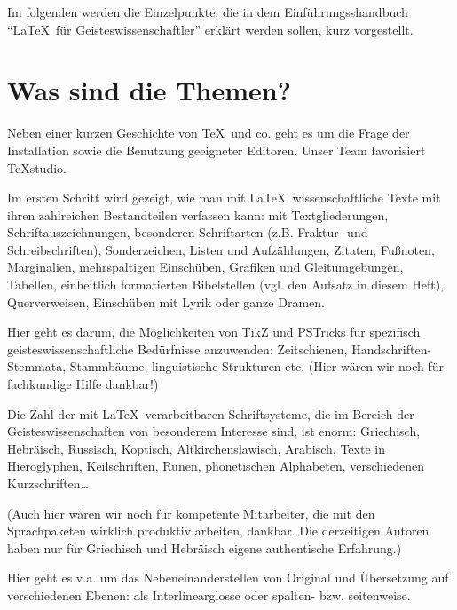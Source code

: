 \documentclass[ngerman]{dtk}
\begin{document}
Im folgenden werden die Einzelpunkte, die in dem Einführungsshandbuch \enquote{\LaTeX\ für Geisteswissenschaftler}
erklärt werden sollen, kurz vorgestellt.


\section{Was sind die Themen?}



Neben einer kurzen Geschichte von \TeX\ und co. geht es um die Frage der Installation sowie die Benutzung 
geeigneter Editoren.
Unser Team favorisiert TeXstudio.


Im ersten Schritt wird gezeigt, wie man mit \LaTeX\ wissenschaftliche Texte mit ihren zahlreichen Bestandteilen
verfassen kann: mit Textgliederungen, Schriftauszeichnungen, besonderen Schriftarten (z.B. Fraktur- und
Schreibschriften), Sonderzeichen, Listen und Aufzählungen, Zitaten, Fußnoten, Marginalien, mehrspaltigen
Einschüben, Grafiken und Gleitumgebungen, Tabellen, einheitlich formatierten Bibelstellen (vgl. den Aufsatz
in diesem Heft), Querverweisen, Einschüben mit Lyrik oder ganze Dramen.  


Hier geht es darum, die Möglichkeiten von TikZ und PSTricks für spezifisch geisteswissenschaftliche
Bedürfnisse anzuwenden: Zeitschienen, Handschriften-Stemmata, Stammbäume, linguistische Strukturen etc.
(Hier wären wir noch für fachkundige Hilfe dankbar!)


Die Zahl der mit \LaTeX\ verarbeitbaren Schriftsysteme, die im Bereich der Geisteswissenschaften von besonderem 
Interesse sind, ist enorm:
Griechisch,
Hebräisch,
Russisch,
Koptisch,
Altkirchenslawisch,
Arabisch,
Texte in Hieroglyphen,
Keilschriften,
Runen,
phonetischen Alphabeten,
verschiedenen Kurzschriften\ldots

(Auch hier wären wir noch für kompetente Mitarbeiter, die mit den Sprachpaketen wirklich produktiv 
arbeiten, dankbar. Die derzeitigen Autoren haben nur für Griechisch und Hebräisch eigene authentische 
Erfahrung.)


Hier geht es v.a. um das Nebeneinanderstellen von Original und Übersetzung auf verschiedenen Ebenen:
als Interlinearglosse oder spalten- bzw. seitenweise.
\end{document}
